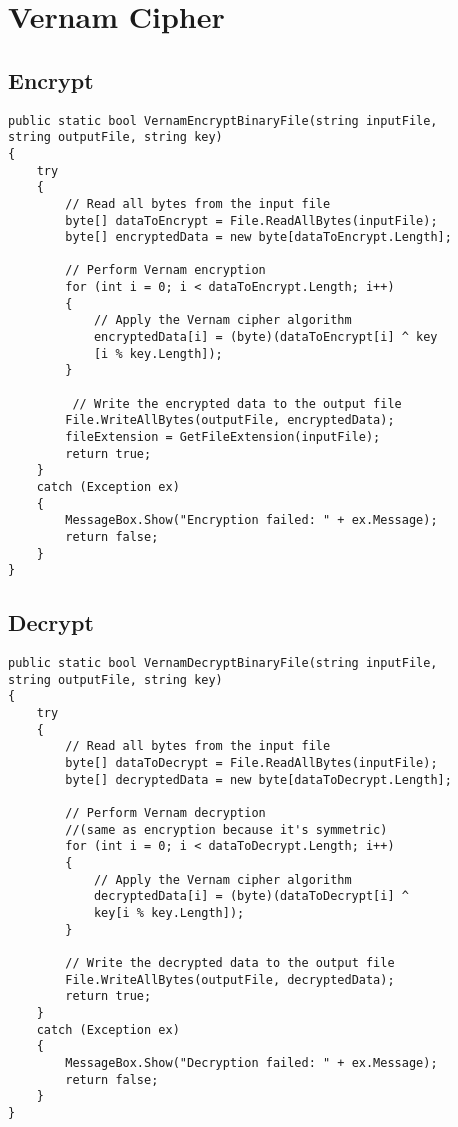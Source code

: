 \documentclass[a4paper,oneside,11pt]{book}
\begin{document}
\chapter[Vernam Cipher]{Vernam Cipher}
\section{Encrypt}
\begin{lstlisting}[language=Csh, caption={Endpoint to delete FITS file}]
public static bool VernamEncryptBinaryFile(string inputFile, 
string outputFile, string key)
{
    try
    {
        // Read all bytes from the input file
        byte[] dataToEncrypt = File.ReadAllBytes(inputFile);
        byte[] encryptedData = new byte[dataToEncrypt.Length];
    
        // Perform Vernam encryption
        for (int i = 0; i < dataToEncrypt.Length; i++)
        {
            // Apply the Vernam cipher algorithm
            encryptedData[i] = (byte)(dataToEncrypt[i] ^ key
            [i % key.Length]);
        }
    
         // Write the encrypted data to the output file
        File.WriteAllBytes(outputFile, encryptedData);
        fileExtension = GetFileExtension(inputFile);
        return true;
    }
    catch (Exception ex)
    {
        MessageBox.Show("Encryption failed: " + ex.Message);
        return false;
    }
}
\end{lstlisting}
\section{Decrypt}
\begin{lstlisting}[language=Csh, caption={Endpoint to delete FITS file}]
public static bool VernamDecryptBinaryFile(string inputFile, 
string outputFile, string key)
{
    try
    {
        // Read all bytes from the input file
        byte[] dataToDecrypt = File.ReadAllBytes(inputFile);
        byte[] decryptedData = new byte[dataToDecrypt.Length];
    
        // Perform Vernam decryption
        //(same as encryption because it's symmetric)
        for (int i = 0; i < dataToDecrypt.Length; i++)
        {
            // Apply the Vernam cipher algorithm
            decryptedData[i] = (byte)(dataToDecrypt[i] ^ 
            key[i % key.Length]);
        }
    
        // Write the decrypted data to the output file
        File.WriteAllBytes(outputFile, decryptedData);
        return true;
    }
    catch (Exception ex)
    {
        MessageBox.Show("Decryption failed: " + ex.Message);
        return false;
    }
}
\end{lstlisting}
\end{document}
